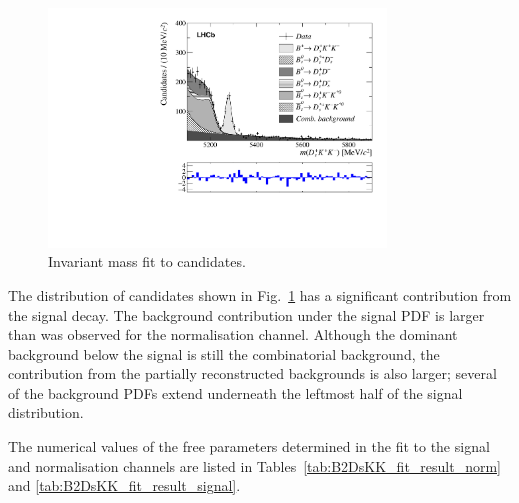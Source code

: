 \begin{figure}[!h]
    \centering
    \includegraphics[width=0.8\textwidth]{figs/B2DsKK/Fit_DsKK.pdf}
    \caption{Invariant mass fit to \decay{\Bp}{\Dsp\Kp\Km} candidates.}
    \label{fig:B2DsKK_fit_B2DsKK}   
\end{figure}

The distribution of \decay{\Bp}{\Dsp\Kp\Km} candidates shown in Fig.~\ref{fig:B2DsKK_fit_B2DsKK} has a significant contribution from the signal decay. The background contribution under the signal PDF is larger than was observed for the normalisation channel. Although the dominant background below the signal is still the combinatorial background, the contribution from the partially reconstructed backgrounds is also larger; several of the background PDFs extend underneath the leftmost half of the signal distribution.  


The numerical values of the free parameters determined in the fit to the signal and normalisation channels are listed in Tables~\ref{tab:B2DsKK_fit_result_norm} and \ref{tab:B2DsKK_fit_result_signal}.

